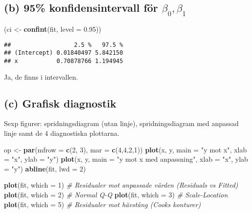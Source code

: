 \documentclass[
  11pt,
]{article}
\newenvironment{Shaded}{\begin{snugshade}}{\end{snugshade}}
\newcommand{\AttributeTok}[1]{\textcolor[rgb]{0.13,0.29,0.53}{#1}}
\newcommand{\CommentTok}[1]{\textcolor[rgb]{0.56,0.35,0.01}{\textit{#1}}}
\newcommand{\DecValTok}[1]{\textcolor[rgb]{0.00,0.00,0.81}{#1}}
\newcommand{\FloatTok}[1]{\textcolor[rgb]{0.00,0.00,0.81}{#1}}
\newcommand{\FunctionTok}[1]{\textcolor[rgb]{0.13,0.29,0.53}{\textbf{#1}}}
\newcommand{\NormalTok}[1]{#1}
\newcommand{\OtherTok}[1]{\textcolor[rgb]{0.56,0.35,0.01}{#1}}
\newcommand{\StringTok}[1]{\textcolor[rgb]{0.31,0.60,0.02}{#1}}
\begin{document}
\subsection{\texorpdfstring{(b) 95\% konfidensintervall för
\(\beta_0,\beta_1\)}{(b) 95\% konfidensintervall för \textbackslash beta\_0,\textbackslash beta\_1}}\label{b-95-konfidensintervall-fuxf6r-beta_0beta_1}

\begin{Shaded}
\begin{Highlighting}[]
\NormalTok{(ci }\OtherTok{\textless{}{-}} \FunctionTok{confint}\NormalTok{(fit, }\AttributeTok{level =} \FloatTok{0.95}\NormalTok{))}
\end{Highlighting}
\end{Shaded}

\begin{verbatim}
##                  2.5 %   97.5 %
## (Intercept) 0.01840497 5.842150
## x           0.70878766 1.194945
\end{verbatim}

Ja, de finns i intervallen.

\subsection{(c) Grafisk diagnostik}\label{c-grafisk-diagnostik}

Sexp figurer: spridningsdiagram (utan linje), spridningsdiagram med
anpassad linje samt de 4 diagnostiska plottarna.

\begin{Shaded}
\begin{Highlighting}[]
\NormalTok{op }\OtherTok{\textless{}{-}} \FunctionTok{par}\NormalTok{(}\AttributeTok{mfrow =} \FunctionTok{c}\NormalTok{(}\DecValTok{2}\NormalTok{, }\DecValTok{3}\NormalTok{), }\AttributeTok{mar =} \FunctionTok{c}\NormalTok{(}\DecValTok{4}\NormalTok{,}\DecValTok{4}\NormalTok{,}\DecValTok{2}\NormalTok{,}\DecValTok{1}\NormalTok{))}
\FunctionTok{plot}\NormalTok{(x, y, }\AttributeTok{main =} \StringTok{"y mot x"}\NormalTok{, }\AttributeTok{xlab =} \StringTok{"x"}\NormalTok{, }\AttributeTok{ylab =} \StringTok{"y"}\NormalTok{)}
\FunctionTok{plot}\NormalTok{(x, y, }\AttributeTok{main =} \StringTok{"y mot x med anpassning"}\NormalTok{, }\AttributeTok{xlab =} \StringTok{"x"}\NormalTok{, }\AttributeTok{ylab =} \StringTok{"y"}\NormalTok{)}
\FunctionTok{abline}\NormalTok{(fit, }\AttributeTok{lwd =} \DecValTok{2}\NormalTok{)}

\FunctionTok{plot}\NormalTok{(fit, }\AttributeTok{which =} \DecValTok{1}\NormalTok{)  }\CommentTok{\# Residualer mot anpassade värden (Residuals vs Fitted)}
\FunctionTok{plot}\NormalTok{(fit, }\AttributeTok{which =} \DecValTok{2}\NormalTok{)  }\CommentTok{\# Normal Q{-}Q}
\FunctionTok{plot}\NormalTok{(fit, }\AttributeTok{which =} \DecValTok{3}\NormalTok{)  }\CommentTok{\# Scale{-}Location}
\FunctionTok{plot}\NormalTok{(fit, }\AttributeTok{which =} \DecValTok{5}\NormalTok{)  }\CommentTok{\# Residualer mot hävstång (Cook\textquotesingle{}s konturer)}
\end{Highlighting}
\end{Shaded}
\end{document}
